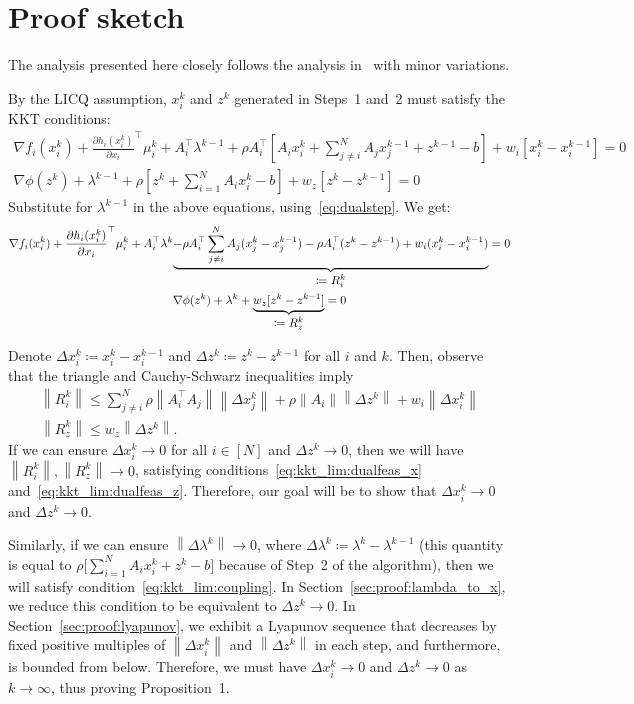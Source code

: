 \documentclass[11pt]{article}
\newcommand{\norm}[1]{\left\lVert #1 \right\rVert}
\begin{document}
\section{Proof sketch}
The analysis presented here closely follows the analysis in~\cite{melo2017iteration,wang2019global} with minor variations.

By the LICQ assumption, $x_i^k$ and $z^k$ generated in Steps~1 and~2 must satisfy the KKT conditions:
\begin{gather*}
\nabla f_i(x_i^k) + \frac{\partial h_i(x_i^k)}{\partial x_i}^\top \mu_i^k + A_i^\top \lambda^{k - 1} + \rho A_i^\top \left[ A_ix_i^k + \sum_{j \neq i}^N A_j x_j^{k-1} + z^{k-1} - b\right] + w_i [x_i^k - x_i^{k-1}] = 0 \\
\nabla \phi(z^k) + \lambda^{k - 1} + \rho \left[z^k + \sum_{i = 1}^N A_i x_i^k - b\right] + w_z [z^k - z^{k-1}] = 0
\end{gather*}
Substitute for $\lambda^{k-1}$ in the above equations, using~\eqref{eq:dualstep}. We get:
\begin{gather}
\nabla f_i(x_i^k) + \frac{\partial h_i(x_i^k)}{\partial x_i}^\top \mu_i^k + A_i^\top \lambda^k \underset{\text{\normalsize $\coloneqq R_i^k$}}{\underbrace{- \rho A_i^\top \sum_{j \neq i}^N A_j (x_j^k - x_j^{k - 1}) - \rho A_i^\top (z^k - z^{k - 1}) + w_i(x_i^k - x_i^{k-1})}} = 0 \label{eq:kkt_primalstep_x} \\
\nabla \phi(z^k) + \lambda^{k} + \underset{\text{\normalsize $\coloneqq R_z^k$}}{\underbrace{w_z [z^k - z^{k-1}]}} = 0 \label{eq:kkt_primalstep_z}
\end{gather}

Denote $\Delta x_i^k \coloneqq x_i^k - x_i^{k - 1}$ and $\Delta z^k \coloneqq z^k - z^{k-1}$ for all $i$ and $k$.
Then, observe that the triangle and Cauchy-Schwarz inequalities imply
\begin{gather*}
\norm{R_i^k} \leq  \sum_{j \neq i}^N \rho \norm{A_i^\top A_j} \norm{\Delta x_j^k} + \rho \norm{A_i} \norm{\Delta z^k} + w_i\norm{\Delta x_i^k} \\
\norm{R_z^k} \leq  w_z\norm{\Delta z^k}.
\end{gather*}
If we can ensure $\Delta x_i^k \to 0$ for all $i \in [N]$ and $\Delta z^k \to 0$, then we will have $\norm{R_i^k}, \norm{R_z^k} \to 0$, satisfying conditions~\eqref{eq:kkt_lim:dualfeas_x} and~\eqref{eq:kkt_lim:dualfeas_z}.
Therefore, our goal will be to show that $\Delta x_i^k \to 0$ and $\Delta z^k \to 0$.

Similarly, if we can ensure $\norm{\Delta \lambda^k} \to 0$, where $\Delta \lambda^k \coloneqq \lambda^k - \lambda^{k-1}$ (this quantity is equal to $\rho \big[\sum_{i = 1}^N A_i x_i^k + z^k - b\big]$ because of Step~2 of the algorithm), then we will satisfy condition~\eqref{eq:kkt_lim:coupling}.
In Section~\ref{sec:proof:lambda_to_x}, we reduce this condition to be equivalent to $\Delta z^k \to 0$.
In Section~\ref{sec:proof:lyapunov}, we exhibit a Lyapunov sequence that decreases by fixed positive multiples of $\norm{\Delta x_i^k}$ and $\norm{\Delta z^k}$ in each step, and furthermore, is bounded from below.
Therefore, we must have $\Delta x_i^k \to 0$ and $\Delta z^k \to 0$ as $k \to \infty$, thus proving Proposition~1.
\end{document}
